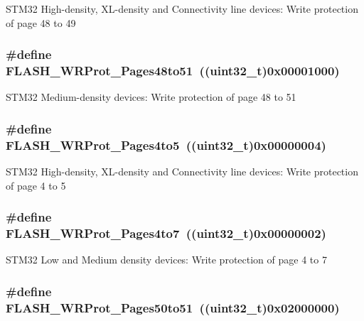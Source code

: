 STM32 High-\/density, XL-\/density and Connectivity line devices: Write protection of page 48 to 49 \hypertarget{group__Option__Bytes__Write__Protection_gac6bb79080cb276b330499f26c706048e}{
\subsubsection[{FLASH\_\-WRProt\_\-Pages48to51}]{\setlength{\rightskip}{0pt plus 5cm}\#define FLASH\_\-WRProt\_\-Pages48to51~((uint32\_\-t)0x00001000)}}
\label{group__Option__Bytes__Write__Protection_gac6bb79080cb276b330499f26c706048e}
STM32 Medium-\/density devices: Write protection of page 48 to 51 \hypertarget{group__Option__Bytes__Write__Protection_ga2835294ea5c096360cc5683b7f90b543}{
\subsubsection[{FLASH\_\-WRProt\_\-Pages4to5}]{\setlength{\rightskip}{0pt plus 5cm}\#define FLASH\_\-WRProt\_\-Pages4to5~((uint32\_\-t)0x00000004)}}
\label{group__Option__Bytes__Write__Protection_ga2835294ea5c096360cc5683b7f90b543}
STM32 High-\/density, XL-\/density and Connectivity line devices: Write protection of page 4 to 5 \hypertarget{group__Option__Bytes__Write__Protection_ga1b33c4de30c55331e7e60c0795c824ad}{
\subsubsection[{FLASH\_\-WRProt\_\-Pages4to7}]{\setlength{\rightskip}{0pt plus 5cm}\#define FLASH\_\-WRProt\_\-Pages4to7~((uint32\_\-t)0x00000002)}}
\label{group__Option__Bytes__Write__Protection_ga1b33c4de30c55331e7e60c0795c824ad}
STM32 Low and Medium density devices: Write protection of page 4 to 7 \hypertarget{group__Option__Bytes__Write__Protection_ga053321e47944270a5fdcf0d58e16ec13}{
\subsubsection[{FLASH\_\-WRProt\_\-Pages50to51}]{\setlength{\rightskip}{0pt plus 5cm}\#define FLASH\_\-WRProt\_\-Pages50to51~((uint32\_\-t)0x02000000)}}
